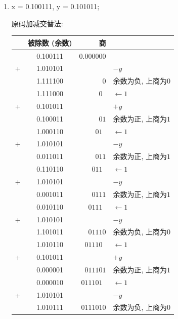 \documentclass[UTF8]{report}
\newcommand{\la}{\leftarrow}
\newcommand{\spz}{\phantom{0}}
\newenvironment{solution}{{\noindent\hskip 2em \bf 解 \quad}}{}
\begin{document}
\begin{solution}
    \begin{enumerate}
\item x =  0.100111, y =  0.101011;
        
        原码加减交替法:
        \begin{tabular}{cc|r|l}
            & 被除数 (余数)   & 商    & \\
           \hline
            & 0.100111 &  $0.000000 $ &   \\
           +& 1.010101 &         $ $ &  $-y$ \\
           \hline
            & 1.111100 &        $0 $ & 余数为负, 上商为$0$ \\
            & 1.111000 &     $0\spz$ & $\la 1$ \\
           +& 0.101011 &         $ $ &  $+y$ \\
           \hline
            & 0.100011 &       $01 $ & 余数为正, 上商为$1$ \\
            & 1.000110 &    $01\spz$ & $\la 1$ \\
           +& 1.010101 &         $ $ &  $-y$ \\
           \hline
            & 0.011011 &      $011 $ & 余数为正, 上商为$1$ \\
            & 0.110110 &   $011\spz$ & $\la 1$ \\
           +& 1.010101 &         $ $ &  $-y$ \\
           \hline
            & 0.001011 &     $0111 $ & 余数为正, 上商为$1$ \\
            & 0.010110 &  $0111\spz$ & $\la 1$ \\
           +& 1.010101 &         $ $ &  $-y$ \\
           \hline
            & 1.101011 &    $01110 $ & 余数为负, 上商为$0$ \\
            & 1.010110 & $01110\spz$ & $\la 1$ \\
           +& 0.101011 &         $ $ &  $+y$ \\
           \hline
            & 0.000001 &   $011101 $ & 余数为正, 上商为$1$ \\
            & 0.000010 &$011101\spz$ & $\la 1$ \\
           +& 1.010101 &         $ $ & $-y$ \\
           \hline
            & 1.010111 &  $0111010 $ & 余数为负, 上商为$0$ \\
        \end{tabular}


\end{enumerate}
\end{solution}
\end{document}
